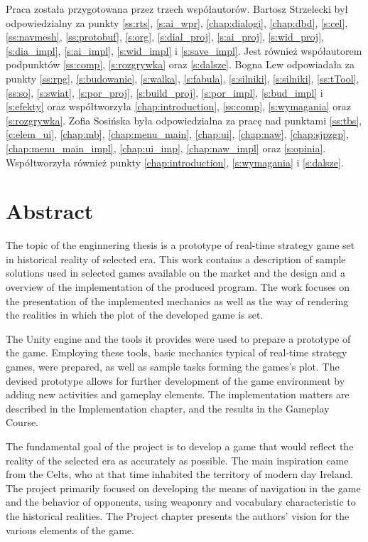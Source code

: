 Praca została przygotowana przez trzech współautorów. Bartosz Strzelecki był odpowiedzialny za punkty \ref{ss:rts},
\ref{s:ai_wpr}, \ref{chap:dialogi}, \ref{chap:dbd}, \ref{s:cel}, \ref{ss:navmesh}, \ref{ss:protobuf}, \ref{s:org},
\ref{s:dial_proj}, \ref{s:ai_proj}, \ref{s:wid_proj}, \ref{s:dia_impl}, \ref{s:ai_impl}, \ref{s:wid_impl} i
\ref{s:save_impl}. Jest również współautorem podpunktów \ref{ss:comp}, \ref{s:rozgrywka} oraz \ref{s:dalsze}. Bogna Lew
odpowiadała za punkty \ref{ss:rpg}, \ref{s:budowanie}, \ref{s:walka}, \ref{s:fabula}, \ref{s:silniki}, \ref{s:silniki},
\ref{ss:tTool}, \ref{ss:so}, \ref{s:swiat}, \ref{s:por_proj}, \ref{s:build_proj}, \ref{s:por_impl}, \ref{s:bud_impl} i
\ref{s:efekty} oraz współtworzyła \ref{chap:introduction}, \ref{ss:comp}, \ref{s:wymagania} oraz \ref{s:rozgrywka}.
Zofia Sosińska była odpowiedzialna za pracę nad punktami \ref{ss:tbs}, \ref{c:elem_ui}, \ref{chap:mb},
\ref{chap:menu_main}, \ref{chap:ui}, \ref{chap:naw}, \ref{chap:sjpzgp}, \ref{chap:menu_main_impl}, \ref{chap:ui_imp},
\ref{chap:naw_impl} oraz \ref{s:opinia}. Współtworzyła również punkty \ref{chap:introduction}, \ref{s:wymagania} i \ref{s:dalsze}.

\chapter*{Abstract}
The topic of the enginnering thesis is a prototype of real-time strategy game set in historical reality of selected era.
This work contains a description of sample solutions used in selected games available on the market
and the design and a overview of the implementation of the produced program. The work focuses on the presentation 
of the implemented mechanics as well as
the way of rendering the realities in which the plot of the developed game is set.

The Unity engine and the tools it provides were used to prepare a prototype of the game.
Employing these tools, basic mechanics typical of real-time strategy games, were prepared,
as well as sample tasks forming the games's plot. The devised prototype allows for 
further development of the game environment by adding new activities and gameplay elements.
The implementation matters are described in the Implementation chapter, and the results in the Gameplay Course.

The fundamental goal of the project is to develop a game that would reflect the reality of the selected era as accurately as possible.
The main inspiration came from the Celts, who at that time inhabited the territory of modern day Ireland. 
The project primarily focused on
developing the means of navigation in the game and the behavior of opponents, using weaponry and vocabulary characteristic to the
historical realities. The Project chapter presents the authors' vision for the various elements of the game.

